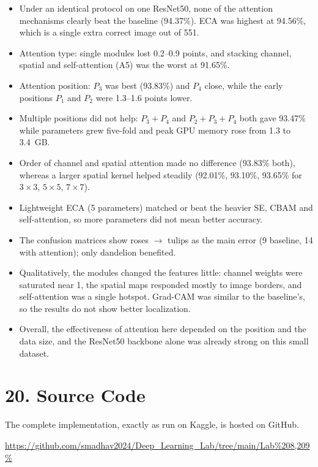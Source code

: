 \documentclass[10pt]{article}
\begin{document}
\begin{itemize}
\item Under an identical protocol on one ResNet50, none of the attention
mechanisms clearly beat the baseline (94.37\%). ECA was highest at 94.56\%,
which is a single extra correct image out of 551.
\item Attention type: single modules lost 0.2--0.9 points, and stacking channel,
spatial and self-attention (A5) was the worst at 91.65\%.
\item Attention position: $P_3$ was best (93.83\%) and $P_4$ close, while the
early positions $P_1$ and $P_2$ were 1.3--1.6 points lower.
\item Multiple positions did not help: $P_3+P_4$ and $P_2+P_3+P_4$ both gave
93.47\% while parameters grew five-fold and peak GPU memory rose from 1.3 to
3.4~GB.
\item Order of channel and spatial attention made no difference (93.83\% both),
whereas a larger spatial kernel helped steadily (92.01\%, 93.10\%, 93.65\%
for $3\times3$, $5\times5$, $7\times7$).
\item Lightweight ECA (5 parameters) matched or beat the heavier SE, CBAM and
self-attention, so more parameters did not mean better accuracy.
\item The confusion matrices show roses $\rightarrow$ tulips as the main error
(9 baseline, 14 with attention); only dandelion benefited.
\item Qualitatively, the modules changed the features little: channel weights
were saturated near 1, the spatial maps responded mostly to image borders,
and self-attention was a single hotspot. Grad-CAM was similar to the
baseline's, so the results do not show better localization.
\item Overall, the effectiveness of attention here depended on the position
and the data size, and the ResNet50 backbone alone was already strong on this
small dataset.
\end{itemize}

\section*{20. Source Code}

The complete implementation, exactly as run on Kaggle, is hosted on GitHub.

\url{https://github.com/smadhav2024/Deep_Learning_Lab/tree/main/Lab%208,209%}
\end{document}
